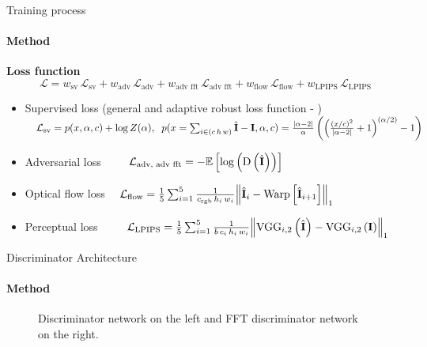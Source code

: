 \documentclass[
	ngerman,
	aspectratio=169,
	color={accentcolor=3d},
	logo=false,
	colorframetitle=true,
	]{tudabeamer}
\newcommand{\Tensor}[1]{\boldsymbol{\mathrm{\MakeUppercase{#1}}}}
\newcommand{\Mean}[1]{\mathbb{E}\left[#1\right]}
\begin{document}
\begin{frame}{Training process}
\framesubtitle{Method}
\textbf{Loss function}
\begin{equation}
    \mathcal{L}=w_{\text{sv}}\,\mathcal{L}_{\text{sv}} + w_{\text{adv}}\,\mathcal{L}_{\text{adv}} + w_{\text{adv fft}}\,\mathcal{L}_{\text{adv fft}} + w_{\text{flow}}\,\mathcal{L}_{\text{flow}} + w_{\text{LPIPS}}\,\mathcal{L}_{\text{LPIPS}}
\end{equation}
\pause
\begin{itemize}
    \item Supervised loss (general and adaptive robust loss function - \citet{adaptiveroubustloss}) $\quad\mathcal{L}_{\text{sv}}=p(x,\alpha,c)+\log Z(\alpha),\;\; p(x=\sum_{i\in(c\,h\,w)}\hat{\Tensor{I}}-\Tensor{I},\alpha,c)=\frac{\abs{\alpha -2}}{\alpha}\left(\left(\frac{\left(x/c\right)^2}{\abs{\alpha-2}}+1\right)^{(\alpha/2)}-1\right)$
    \item Adversarial loss \cite{gan} $\quad\quad\,\mathcal{L}_{\text{adv, adv fft}}=-\Mean{\log\left(\operatorname{D}\left(\hat{\Tensor{I}}\right)\right)}$
    \item Optical flow loss \cite{pwcnet, deepfovea} $\quad\mathcal{L}_{\text{flow}}=\frac{1}{5}\sum_{i=1}^{5}\frac{1}{c_{\text{rgb}}\,h_{i}\,w_{i}}\norm{\hat{\Tensor{I}}_{i}-\operatorname{Warp}\left[\hat{\Tensor{I}}_{i+1}\right]}_{1}$
    \item Perceptual loss \cite{perceptual} $\quad\quad\;\mathcal{L}_{\text{LPIPS}} = \frac{1}{5}\sum_{i=1}^{5}\frac{1}{b\,c_{i}\,h_{i}\,w_{i}}\norm{\operatorname{VGG}_{i,2}\left(\hat{\Tensor{I}}\right) - \operatorname{VGG}_{i,2}\left(\Tensor{I}\right)}_{1}$
\end{itemize}
\end{frame}

\begin{frame}{Discriminator Architecture}
\framesubtitle{Method}
    \vspace{0.5cm}
    \begin{figure}
        \centering
        \hspace{1.0cm}
        \caption{Discriminator network on the left and FFT discriminator network on the right.}
        \label{fig:discriminatornetorks}
    \end{figure}
\end{frame}
\end{document}
